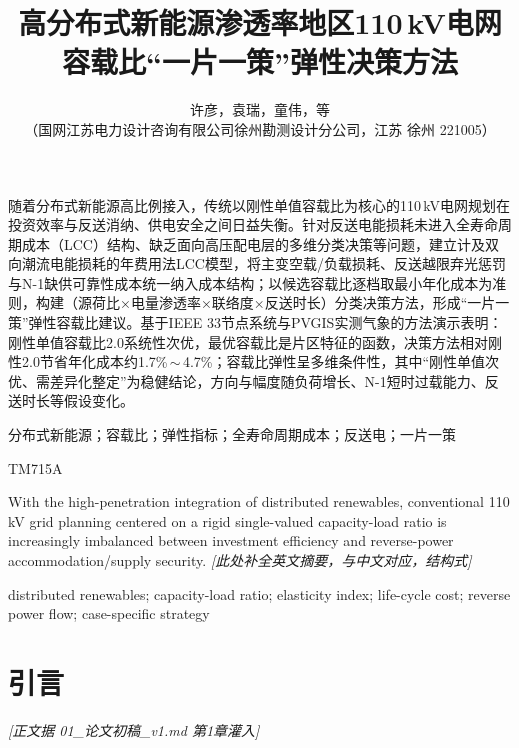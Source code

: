 \documentclass[a4paper,11pt]{ctexart}   %
\title{\bfseries 高分布式新能源渗透率地区110\,kV电网容载比“一片一策”弹性决策方法}
\author{许彦，袁瑞，童伟，等\\[2pt]
\small（国网江苏电力设计咨询有限公司徐州勘测设计分公司，江苏 徐州 221005）}
\date{}
\begin{document}
\maketitle
\thispagestyle{empty}

随着分布式新能源高比例接入，传统以刚性单值容载比为核心的110\,kV电网规划在投资效率与反送消纳、供电安全之间日益失衡。针对反送电能损耗未进入全寿命周期成本（LCC）结构、缺乏面向高压配电层的多维分类决策等问题，建立计及双向潮流电能损耗的年费用法LCC模型，将主变空载/负载损耗、反送越限弃光惩罚与N-1缺供可靠性成本统一纳入成本结构；以候选容载比逐档取最小年化成本为准则，构建（源荷比×电量渗透率×联络度×反送时长）分类决策方法，形成“一片一策”弹性容载比建议。基于IEEE 33节点系统与PVGIS实测气象的方法演示表明：刚性单值容载比2.0系统性次优，最优容载比是片区特征的函数，决策方法相对刚性2.0节省年化成本约1.7\%\,$\sim$\,4.7\%；容载比弹性呈多维条件性，其中“刚性单值次优、需差异化整定”为稳健结论，方向与幅度随负荷增长、N-1短时过载能力、反送时长等假设变化。

\vspace{4pt}
分布式新能源；容载比；弹性指标；全寿命周期成本；反送电；一片一策

\vspace{2pt}
TM715A

\vspace{6pt}
 With the high-penetration integration of distributed renewables, conventional 110\,kV grid planning centered on a rigid single-valued capacity-load ratio is increasingly imbalanced between investment efficiency and reverse-power accommodation/supply security. \emph{[此处补全英文摘要，与中文对应，结构式]}

\vspace{2pt}
 distributed renewables; capacity-load ratio; elasticity index; life-cycle cost; reverse power flow; case-specific strategy

\section{引言}
\emph{[正文据 01\_论文初稿\_v1.md 第1章灌入]}
\end{document}
